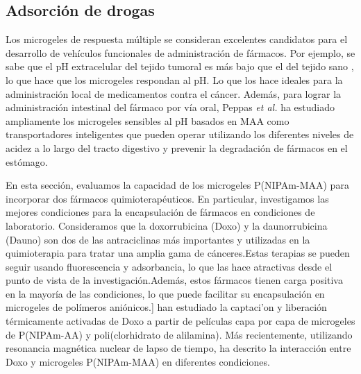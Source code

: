 \subsection{Adsorci\'on de drogas}

Los microgeles de respuesta m\'ultiple se consideran excelentes candidatos para el desarrollo de veh\'iculos funcionales de administraci\'on de f\'armacos.
Por ejemplo, se sabe que el pH extracelular del tejido tumoral es m\'as bajo que el del tejido sano \addcite[Gerweck1996], lo que hace que los microgeles respondan al pH.
Lo que los hace ideales para la administraci\'on local de medicamentos contra el c\'ancer\addcite[Dadsetan2013].
Adem\'as, para lograr la administraci\'on intestinal del f\'armaco por v\'ia oral,
Peppas \emph{et al.} ha estudiado ampliamente los microgeles sensibles al pH basados en MAA como transportadores inteligentes que pueden operar utilizando los diferentes niveles de acidez a lo largo del tracto digestivo y prevenir la degradación de f\'armacos en el est\'omago.


En esta secci\'on, evaluamos la capacidad de los microgeles P(NIPAm-MAA) para incorporar dos f\'armacos quimioterap\'euticos.
En particular, investigamos las mejores condiciones para la encapsulaci\'on de f\'armacos en condiciones de laboratorio.
Consideramos que la doxorrubicina (Doxo) y la daunorrubicina (Dauno) son dos de las antraciclinas m\'as importantes y  utilizadas en la quimioterapia para tratar una amplia gama de c\'anceres.
Estas terapias se pueden seguir usando fluorescencia y adsorbancia, lo que las hace atractivas desde el punto de vista de la investigaci\'on.
Adem\'as, estos f\'armacos tienen carga positiva en la mayor\'ia de las condiciones, lo que puede facilitar su encapsulaci\'on en microgeles de pol\'imeros ani\'onicos.\addcite[Li2019]]
 han estudiado la captaci'on y liberaci\'on t\'ermicamente activadas de Doxo a partir de pel\'iculas capa por capa de microgeles de P(NIPAm-AA) y poli(clorhidrato de alilamina).
M\'as recientemente, utilizando resonancia magn\'etica nuclear de lapso de tiempo,  ha descrito la interacci\'on entre Doxo y microgeles P(NIPAm-MAA) en diferentes condiciones.



